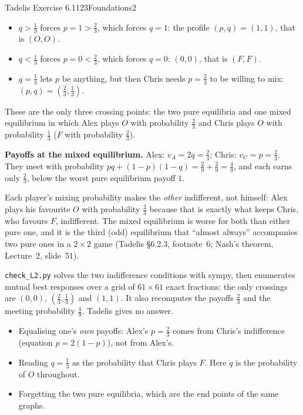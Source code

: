 \begin{exsol}{Tadelis Exercise 6.1}{123}{Foundations}{2}
\begin{itemize}
  \item $q > \tfrac13$ forces $p = 1 > \tfrac23$, which forces $q = 1$: the profile $(p,q) = (1,1)$,
  that is $(O,O)$.
  \item $q < \tfrac13$ forces $p = 0 < \tfrac23$, which forces $q = 0$: $(0,0)$, that is $(F,F)$.
  \item $q = \tfrac13$ lets $p$ be anything, but then Chris needs $p = \tfrac23$ to be willing to mix:
  $(p,q) = (\tfrac23, \tfrac13)$.
\end{itemize}
These are the only three crossing points: the two pure equilibria and one mixed equilibrium in
which Alex plays $O$ with probability $\tfrac23$ and Chris plays $O$ with probability $\tfrac13$
($F$ with probability $\tfrac23$).

\textbf{Payoffs at the mixed equilibrium.} Alex: $v_A = 2q = \tfrac23$; Chris: $v_C = p = \tfrac23$.
They meet with probability $pq + (1-p)(1-q) = \tfrac29 + \tfrac29 = \tfrac49$, and each earns only $\tfrac23$,
below the worst pure equilibrium payoff $1$.


\interp Each player's mixing probability makes the \emph{other} indifferent, not himself: Alex plays
his favourite $O$ with probability $\tfrac23$ because that is exactly what keeps Chris, who favours
$F$, indifferent. The mixed equilibrium is worse for both than either pure one, and it is the
third (odd) equilibrium that ``almost always'' accompanies two pure ones in a $2\times2$ game
(Tadelis \S6.2.3, footnote~6; Nash's theorem, Lecture~2, slide~51).

\verify \texttt{check\_L2.py} solves the two indifference conditions with sympy, then enumerates
mutual best responses over a grid of $61 \times 61$ exact fractions: the only crossings are $(0,0)$,
$(\tfrac23,\tfrac13)$ and $(1,1)$. It also recomputes the payoffs $\tfrac23$ and the meeting
probability $\tfrac49$. Tadelis gives no answer.

\mistakes
\begin{itemize}
  \item Equalising one's \emph{own} payoffs: Alex's $p = \tfrac23$ comes from Chris's indifference
  (equation $p = 2(1-p)$), not from Alex's.
  \item Reading $q = \tfrac13$ as the probability that Chris plays $F$. Here $q$ is the probability
  of $O$ throughout.
  \item Forgetting the two pure equilibria, which are the end points of the same graphs.
\end{itemize}
\end{exsol}
